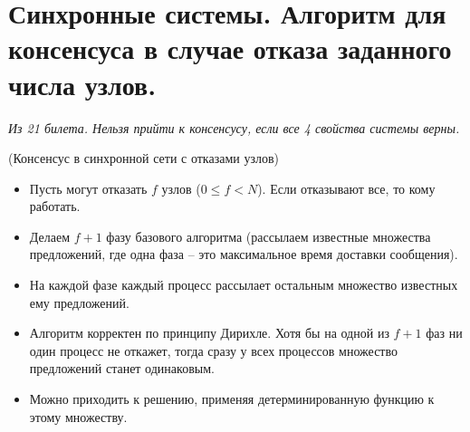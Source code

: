 \section{Синхронные системы. Алгоритм для консенсуса в случае отказа заданного числа узлов.}

\textit{Из 21 билета. Нельзя прийти к консенсусу, если все 4 свойства системы верны.}

\begin{algorithm} (Консенсус в синхронной сети с отказами узлов)
    \begin{itemize}
        \item Пусть могут отказать $f$ узлов ($0 \leq f < N$). Если отказывают все, то кому работать.
        \item Делаем $f + 1$ фазу базового алгоритма (рассылаем известные множества предложений,
            где одна фаза -- это максимальное время доставки сообщения).
        \item На каждой фазе каждый процесс рассылает остальным множество известных ему
            предложений.
        \item Алгоритм корректен по принципу Дирихле. Хотя бы на одной из $f + 1$ фаз
            ни один процесс не откажет, тогда сразу у всех процессов множество предложений
            станет одинаковым.
        \item Можно приходить к решению, применяя детерминированную функцию к этому множеству.
    \end{itemize}
\end{algorithm}

